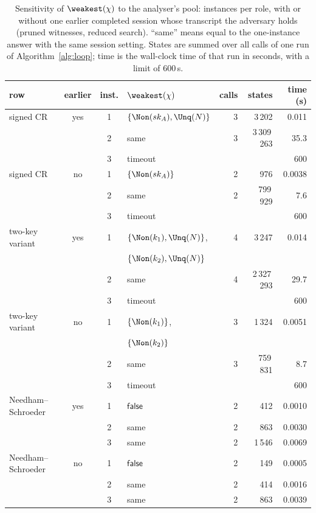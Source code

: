 \begin{table}[tbp]
\caption{Sensitivity of $\weakest(\chi)$ to the analyser's pool: instances per role, with or without one earlier completed session whose transcript the adversary holds (pruned witnesses, reduced search). ``same'' means equal to the one-instance answer with the same session setting. States are summed over all calls of one run of Algorithm~\ref{alg:loop}; time is the wall-clock time of that run in seconds, with a limit of 600\,s.}
\label{tab:bound}
\centering
\setlength{\tabcolsep}{3pt}
\footnotesize
\begin{tabular}{l c c l r r r}
\toprule
row & earlier & inst. & $\weakest(\chi)$ & calls & states & time (s)\\
\midrule
signed CR & yes & 1 & $\{\Non(sk_A), \Unq(N)\}$ & 3 & 3\,202 & 0.011\\
 &  & 2 & same & 3 & 3\,309\,263 & 35.3\\
 &  & 3 & \multicolumn{3}{l}{timeout} & 600\\
\addlinespace[2pt]
signed CR & no & 1 & $\{\Non(sk_A)\}$ & 2 & 976 & 0.0038\\
 &  & 2 & same & 2 & 799\,929 & 7.6\\
 &  & 3 & \multicolumn{3}{l}{timeout} & 600\\
\addlinespace[2pt]
two-key variant & yes & 1 & $\{\Non(k_1), \Unq(N)\}$, & 4 & 3\,247 & 0.014\\
 & & & $\{\Non(k_2), \Unq(N)\}$ & & & \\
 &  & 2 & same & 4 & 2\,327\,293 & 29.7\\
 &  & 3 & \multicolumn{3}{l}{timeout} & 600\\
\addlinespace[2pt]
two-key variant & no & 1 & $\{\Non(k_1)\}$, & 3 & 1\,324 & 0.0051\\
 & & & $\{\Non(k_2)\}$ & & & \\
 &  & 2 & same & 3 & 759\,831 & 8.7\\
 &  & 3 & \multicolumn{3}{l}{timeout} & 600\\
\addlinespace[2pt]
Needham--Schroeder & yes & 1 & $\mathsf{false}$ & 2 & 412 & 0.0010\\
 &  & 2 & same & 2 & 863 & 0.0030\\
 &  & 3 & same & 2 & 1\,546 & 0.0069\\
\addlinespace[2pt]
Needham--Schroeder & no & 1 & $\mathsf{false}$ & 2 & 149 & 0.0005\\
 &  & 2 & same & 2 & 414 & 0.0016\\
 &  & 3 & same & 2 & 863 & 0.0039\\

\end{tabular}
\end{table}
